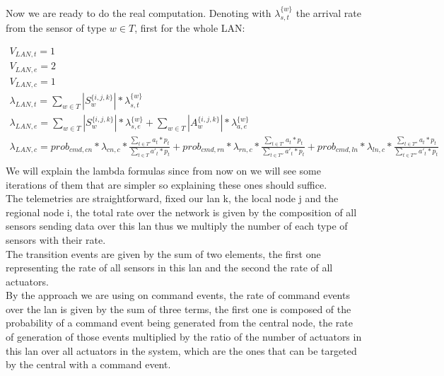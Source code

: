\documentclass[11pt]{article}
\begin{document}
Now we are ready to do the real computation. Denoting with $\lambda^{\{w\}}_{s, t}$ the arrival rate from the sensor of type $w \in T$, first for the whole LAN: 

\begin{equation}
    \begin{array}{l}
        V_{LAN, t} = 1 \\
        V_{LAN, e} = 2 \\ %
        V_{LAN,c} = 1 \\
        \lambda_{LAN, t} = \sum\limits_{w \in T}{| S^{\{i,j,k\}}_{w} | * \lambda^{\{w\}}_{s, t}}  \\
        \lambda_{LAN, e} = \sum\limits_{w \in T}{| S^{\{i,j,k\}}_{w} | * \lambda^{\{w\}}_{s, e}} + \sum\limits_{w \in T}{| A^{\{i,j,k\}}_{w} | * \lambda^{\{w\}}_{a, e}}\\
		\lambda_{LAN, c} = prob_{cmd,cn} * \lambda_{cn, c} * \frac{\sum\limits_{t \in T'}{a_{t} * p_{t}}}{\sum\limits_{t \in T}{a'_{t} * p_{t}}} + prob_{cmd,rn} * \lambda_{rn, c} *\frac{\sum\limits_{t \in T'}{a_{t} * p_{t}}}{\sum\limits_{t \in T''}{a'_{t} * p_{t}}}  + prob_{cmd,ln} * \lambda_{ln, c} * \frac{\sum\limits_{t \in T''}{a_{t} * p_{t}}}{\sum\limits_{t \in T'''}{a'_{t} * p_{t}}}  \\\

    \end{array}
\end{equation}
We will explain the lambda formulas since from now on we will see some iterations of them that are simpler so explaining these ones should suffice.\\
The telemetries are straightforward, fixed our lan k, the local node j and the regional node i, the total rate over the network is given by the composition of all sensors sending data over this lan thus we multiply the number of each type of sensors with their rate.\\
The transition events are given by the sum of two elements, the first one representing the rate of all sensors in this lan and the second the rate of all actuators.\\
By the approach we are using on command events, the rate of command events over the lan is given by the sum of three terms, the first one is composed of the probability of a command event being generated from the central node, the rate of generation of those events multiplied by the ratio of the number of actuators in this lan over all actuators in the system, which are the ones that can be targeted by the central with a command event.\\
\end{document}
